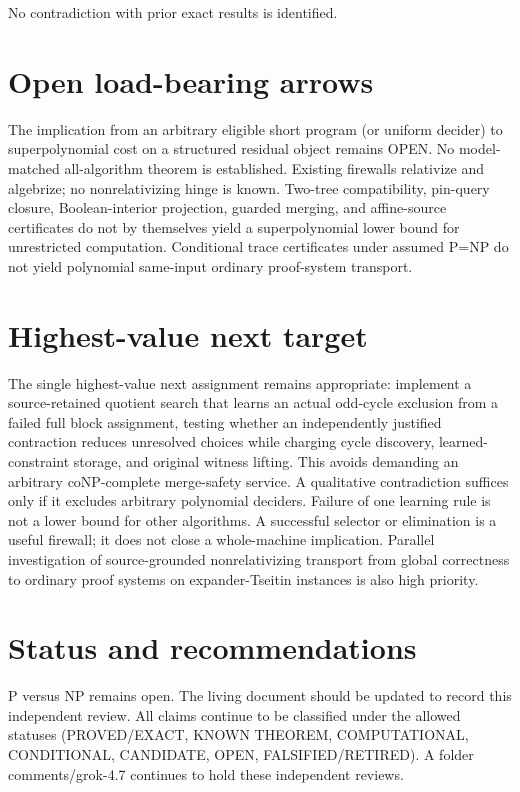 \documentclass[11pt]{article}
\begin{document}
No contradiction with prior exact results is identified.

\section{Open load-bearing arrows}
The implication from an arbitrary eligible short program (or uniform decider) to superpolynomial cost on a structured residual object remains OPEN. No model-matched all-algorithm theorem is established. Existing firewalls relativize and algebrize; no nonrelativizing hinge is known. Two-tree compatibility, pin-query closure, Boolean-interior projection, guarded merging, and affine-source certificates do not by themselves yield a superpolynomial lower bound for unrestricted computation. Conditional trace certificates under assumed P=NP do not yield polynomial same-input ordinary proof-system transport.

\section{Highest-value next target}
The single highest-value next assignment remains appropriate: implement a source-retained quotient search that learns an actual odd-cycle exclusion from a failed full block assignment, testing whether an independently justified contraction reduces unresolved choices while charging cycle discovery, learned-constraint storage, and original witness lifting. This avoids demanding an arbitrary coNP-complete merge-safety service. A qualitative contradiction suffices only if it excludes arbitrary polynomial deciders. Failure of one learning rule is not a lower bound for other algorithms. A successful selector or elimination is a useful firewall; it does not close a whole-machine implication. Parallel investigation of source-grounded nonrelativizing transport from global correctness to ordinary proof systems on expander-Tseitin instances is also high priority.

\section{Status and recommendations}
P versus NP remains open. The living document should be updated to record this independent review. All claims continue to be classified under the allowed statuses (PROVED/EXACT, KNOWN THEOREM, COMPUTATIONAL, CONDITIONAL, CANDIDATE, OPEN, FALSIFIED/RETIRED). A folder comments/grok-4.7 continues to hold these independent reviews.

\end{document}
